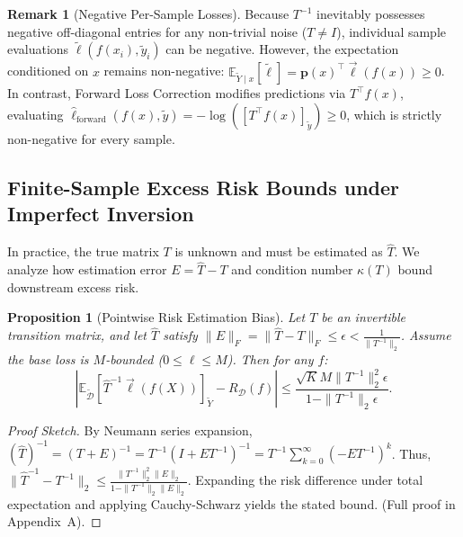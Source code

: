 \documentclass[10pt,twocolumn]{article}
\newtheorem{proposition}{Proposition}
\theoremstyle{definition}
\newtheorem{remark}{Remark}
\begin{document}
\begin{remark}[Negative Per-Sample Losses]
Because $T^{-1}$ inevitably possesses negative off-diagonal entries for any non-trivial noise ($T \ne I$), individual sample evaluations $\tilde{\ell}(f(x_i), \tilde{y}_i)$ can be negative. However, the expectation conditioned on $x$ remains non-negative: $\mathbb{E}_{\tilde{Y} \mid x}[\tilde{\ell}] = \mathbf{p}(x)^\top \vec{\ell}(f(x)) \ge 0$. In contrast, Forward Loss Correction modifies predictions via $T^\top f(x)$, evaluating $\hat{\ell}_{\text{forward}}(f(x), \tilde{y}) = -\log([T^\top f(x)]_{\tilde{y}}) \ge 0$, which is strictly non-negative for every sample.
\end{remark}

\subsection{Finite-Sample Excess Risk Bounds under Imperfect Inversion}
In practice, the true matrix $T$ is unknown and must be estimated as $\hat{T}$. We analyze how estimation error $E = \hat{T} - T$ and condition number $\kappa(T)$ bound downstream excess risk.

\begin{proposition}[Pointwise Risk Estimation Bias]
\label{prop:bias}
Let $T$ be an invertible transition matrix, and let $\hat{T}$ satisfy $\|E\|_F = \|\hat{T} - T\|_F \le \epsilon < \frac{1}{\|T^{-1}\|_2}$. Assume the base loss is $M$-bounded ($0 \le \ell \le M$). Then for any $f$:
\begin{equation}
\left| \mathbb{E}_{\tilde{\mathcal{D}}} [\hat{T}^{-1} \vec{\ell}(f(X))]_{\tilde{Y}} - R_{\mathcal{D}}(f) \right| \le \frac{\sqrt{K} M \|T^{-1}\|_2^2 \epsilon}{1 - \|T^{-1}\|_2 \epsilon}.
\end{equation}
\end{proposition}

\begin{proof}[Proof Sketch]
By Neumann series expansion, $(\hat{T})^{-1} = (T + E)^{-1} = T^{-1} (I + E T^{-1})^{-1} = T^{-1} \sum_{k=0}^\infty (-E T^{-1})^k$. Thus, $\|\hat{T}^{-1} - T^{-1}\|_2 \le \frac{\|T^{-1}\|_2^2 \|E\|_2}{1 - \|T^{-1}\|_2 \|E\|_2}$. Expanding the risk difference under total expectation and applying Cauchy-Schwarz yields the stated bound. (Full proof in Appendix~A).
\end{proof}
\end{document}
